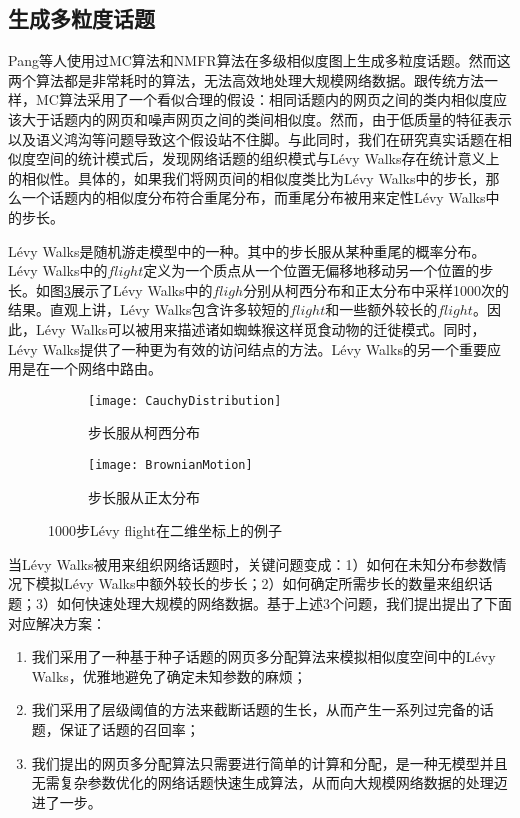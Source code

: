 \subsection{生成多粒度话题}

Pang等人使用过MC算法和NMFR算法在多级相似度图上生成多粒度话题。然而这两个算法都是非常耗时的算法，无法高效地处理大规模网络数据。跟传统方法一样，MC算法采用了一个看似合理的假设：相同话题内的网页之间的类内相似度应该大于话题内的网页和噪声网页之间的类间相似度。然而，由于低质量的特征表示以及语义鸿沟等问题导致这个假设站不住脚。与此同时，我们在研究真实话题在相似度空间的统计模式后，发现网络话题的组织模式与L\'evy Walks存在统计意义上的相似性\citep{perkins2014ascaling}。具体的，如果我们将网页间的相似度类比为L\'evy Walks中的步长，那么一个话题内的相似度分布符合重尾分布，而重尾分布被用来定性L\'evy Walks中的步长。

L\'evy Walks\citep{viswanathan2001levy,rhee2011levywalk}是随机游走模型中的一种。其中的步长服从某种重尾的概率分布。L\'evy Walks中的$flight$定义为一个质点从一个位置无偏移地移动另一个位置的步长。如图\ref{fig:levywalks}展示了L\'evy Walks中的$fligh$分别从柯西分布和正太分布中采样1000次的结果。直观上讲，L\'evy Walks包含许多较短的$flight$和一些额外较长的$flight$。因此，L\'evy Walks可以被用来描述诸如蜘蛛猴这样觅食动物的迁徙模式\citep{viswanathan2001levy}。同时，L\'evy Walks提供了一种更为有效的访问结点的方法\citep{li2010towards}。L\'evy Walks的另一个重要应用是在一个网络中路由\citep{perkins2014ascaling}。
\begin{figure}[!htbp]
    \centering
    \begin{subfigure}[b]{0.5\textwidth}
      \texttt{[image: CauchyDistribution]}
      \caption{步长服从柯西分布}
      \label{fig:CauchyDistribution}
    \end{subfigure}%
    \begin{subfigure}[b]{0.5\textwidth}
      \texttt{[image: BrownianMotion]}
      \caption{步长服从正太分布}
      \label{fig:BrownianMotion}
    \end{subfigure}
    \caption{1000步L\'evy flight在二维坐标上的例子}
    \label{fig:levywalks}
\end{figure}

当L\'evy Walks被用来组织网络话题时，关键问题变成：1）如何在未知分布参数情况下模拟L\'evy Walks中额外较长的步长；2）如何确定所需步长的数量来组织话题；3）如何快速处理大规模的网络数据。基于上述3个问题，我们提出提出了下面对应解决方案：
\begin{enumerate}
	\item[(1)] 我们采用了一种基于种子话题的网页多分配算法来模拟相似度空间中的L\'evy Walks，优雅地避免了确定未知参数的麻烦；
	\item[(2)] 我们采用了层级阈值的方法来截断话题的生长，从而产生一系列过完备的话题，保证了话题的召回率；
	\item[(3)] 我们提出的网页多分配算法只需要进行简单的计算和分配，是一种无模型并且无需复杂参数优化的网络话题快速生成算法，从而向大规模网络数据的处理迈进了一步。
\end{enumerate}

